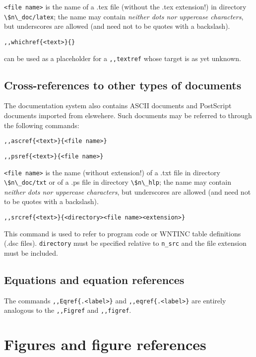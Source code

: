         \verb/<file name>/ is the name of a .tex file (without the .tex
extension!) in directory \verb:\$n\_doc/latex:; the name may contain {\em
neither dots nor uppercase characters}, but underscores are allowed (and need
not to be quotes with a backslash). 

\item   \verb/,,whichref{<text>}{}/ 

         can be used as a placeholder for a \verb/,,textref/ whose target is as
yet unknown. 

\ei 

\subsection{ Cross-references to other types of documents} 
\label{.cross.ref.other} 

        The documentation system also contains ASCII documents and PostScript
documents imported from elswehere. Such documents may be referred to through
the following commands: 

\bi 
\item   \verb/,,ascref{<text>}{<file name>}/ 
\item   \verb/,,psref{<text>}{<file name>}/ 
\ei 

        \verb/<file name>/ is the name (without extension!) of a .txt file in
directory \verb:\$n\_doc/txt: or of a .ps file in directory \verb:\$n\_hlp:;
the name may contain {\em neither dots nor uppercase characters}, but
underscores are allowed (and need not to be quotes with a backslash). 

\bi 
\item   \verb/,,srcref{<text>}{<directory><file name><extension>}/ 
\ei 

        This command is used to refer to program code or WNTINC table
definitions (.dsc files). \verb/directory/ must be specified relative to 
\verb/n_src/ and the file extension must be included. 


\subsection{ Equations and equation references} 
\label{.eqref} 

        The commands \verb/,,Eqref{.<label>}/ and \verb/,,eqref{.<label>}/ are
entirely analogous to the  
\verb/,,Figref/ and \verb/,,figref/. 


\section{ Figures and figure references} 
\label{.fig} 

